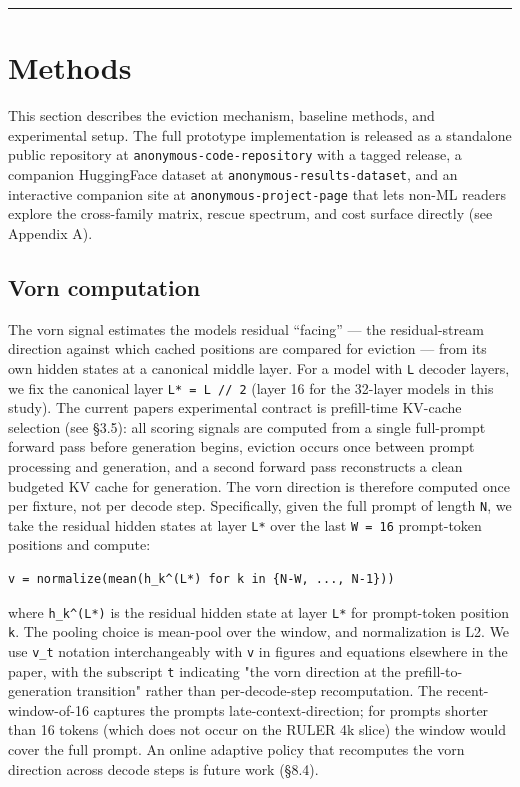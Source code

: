 \documentclass[10pt]{article}
\begin{document}
\begin{center}\rule{0.5\linewidth}{0.5pt}\end{center}

\section{Methods}\label{3-methods}

This section describes the eviction mechanism, baseline methods, and
experimental setup. The full prototype implementation is released as a
standalone public repository at
\texttt{anonymous-code-repository}
with a tagged release, a companion HuggingFace dataset at
\texttt{anonymous-results-dataset},
and an interactive companion site at
\texttt{anonymous-project-page}
that lets non-ML readers explore the cross-family matrix, rescue
spectrum, and cost surface directly (see Appendix A).

\subsection{Vorn computation}\label{31-vorn-computation}

The vorn signal estimates the model\textquotesingle s residual
``facing'' --- the residual-stream direction against which cached
positions are compared for eviction --- from its own hidden states at a
canonical middle layer.
For a model with \texttt{L} decoder layers, we fix the canonical layer
\texttt{L*\ =\ L\ //\ 2} (layer 16 for the 32-layer models in this
study). The current paper\textquotesingle s experimental contract is
prefill-time KV-cache selection (see \S{}3.5): all scoring signals are
computed from a single full-prompt forward pass before generation
begins, eviction occurs once between prompt processing and generation,
and a second forward pass reconstructs a clean budgeted KV cache for
generation. The vorn direction is therefore computed once per fixture,
not per decode step. Specifically, given the full prompt of length
\texttt{N}, we take the residual hidden states at layer \texttt{L*} over
the last \texttt{W\ =\ 16} prompt-token positions and compute:

\begin{verbatim}
v = normalize(mean(h_k^(L*) for k in {N-W, ..., N-1}))
\end{verbatim}

where \texttt{h\_k\^{}(L*)} is the residual hidden state at layer
\texttt{L*} for prompt-token position \texttt{k}. The pooling choice is
mean-pool over the window, and normalization is L2. We use \texttt{v\_t}
notation interchangeably with \texttt{v} in figures and equations
elsewhere in the paper, with the subscript \texttt{t} indicating "the
vorn direction at the prefill-to-generation transition" rather than
per-decode-step recomputation. The recent-window-of-16 captures the
prompt\textquotesingle s late-context-direction; for prompts shorter
than 16 tokens (which does not occur on the RULER 4k slice) the window
would cover the full prompt. An online adaptive policy that recomputes
the vorn direction across decode steps is future work (\S{}8.4).
\end{document}
